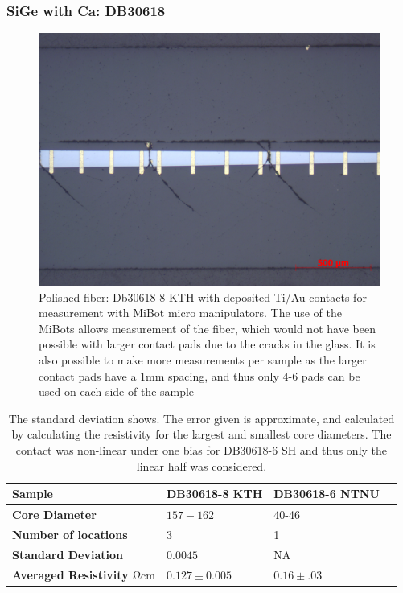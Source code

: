 \FloatBarrier
\subsubsection{SiGe with Ca: DB30618}


\begin{figure}
    \centering
    \includegraphics[width=\textwidth]{fig/Results/kthdb30618-8.jpg}
    \caption{Polished fiber: Db30618-8 KTH with deposited Ti/Au contacts for measurement with MiBot micro manipulators. The use of the MiBots allows measurement of the fiber, which would not have been possible with larger contact pads due to the cracks in the glass. It is also possible to make more measurements per sample as the larger contact pads have a 1mm spacing, and thus only 4-6 pads can be used on each side of the sample}
    \label{fig:db30618KTH}
\end{figure}


\begin{table}[!h]
\begin{center}
\begin{tabular}{ | l | l | l | l |}
\hline
\textbf{Sample}& DB30618-8 KTH & DB30618-6 NTNU \\ \hline
\textbf{Core Diameter}& $157-162$ & 40-46 \\\hline
\textbf{Number of locations}& 3&1 \\\hline
\textbf{Standard Deviation}& $0.0045$& NA \\\hline
\textbf{Averaged Resistivity $\si{\ohm \cm}$}&$0.127 \pm 0.005$& $0.16 \pm .03$  \\\hline
\end{tabular}
\end{center}
\caption{The standard deviation shows. The error given is approximate, and calculated by calculating the resistivity for the largest and smallest core diameters. The contact was non-linear under one bias for DB30618-6 SH and thus only the linear half was considered. }
\label{Tabmb25}
\end{table}
\FloatBarrier

